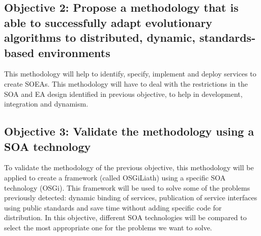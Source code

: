 \newcommand{\objectivemethodology}{Propose a methodology that is able to successfully adapt evolutionary algorithms to distributed, dynamic, standards-based environments}
\subsection*{Objective 2: \objectivemethodology} 
\label{subsec:intro:obj:methodology}
This methodology will help to identify, specify, implement and deploy services to create SOEAs. This methodology will have to deal with the restrictions in the SOA and EA design identified in previous objective, to help in development, integration and dynamism.

\newcommand{\objectiveframework}{Validate the methodology using a SOA technology}
\subsection*{Objective 3: \objectiveframework}
\label{subsec:intro:obj:fwork}
To validate the methodology of the previous objective, this methodology will be applied to create a framework (called OSGiLiath) using a specific SOA technology (OSGi). This framework will be used to solve some of the problems previously detected: dynamic binding of services, publication of service interfaces using public standards and save time without adding specific code for distribution. In this objective, different SOA technologies will be compared to select the most appropriate one for the problems we want to solve.



